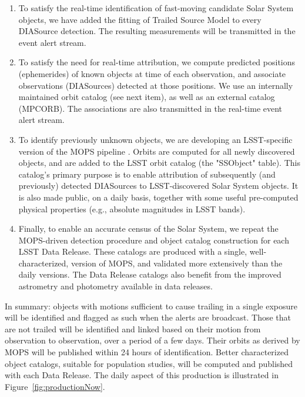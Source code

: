 \documentclass[DM,authoryear,toc]{lsstdoc}
\begin{document}
\begin{enumerate}
	\item To satisfy the real-time identification of fast-moving candidate Solar System objects, we have added the fitting of Trailed Source Model to every DIASource detection. The resulting measurements will be transmitted in the event alert stream.
	\item To satisfy the need for real-time attribution, we compute predicted positions (ephemerides) of known objects at time of each observation, and associate observations (DIASources) detected at those positions. We use an internally maintained orbit catalog (see next item), as well as an external catalog (MPCORB). The associations are also transmitted in the real-time event alert stream.
	\item To identify previously unknown objects, we are developing an LSST-specific version of the MOPS pipeline . Orbits are computed for all newly discovered objects, and are added to the LSST orbit catalog (the "SSObject" table). This catalog's primary purpose is to enable attribution of subsequently (and previously) detected DIASources to LSST-discovered Solar System objects. It is also made public, on a daily basis, together with some useful pre-computed physical properties (e.g., absolute magnitudes in LSST bands).
	\item Finally, to enable an accurate census of the Solar System, we repeat the MOPS-driven detection procedure and object catalog construction for each LSST Data Release. These catalogs are produced with a single, well-characterized, version of MOPS, and validated more extensively than the daily versions. The Data Release catalogs also benefit from the improved astrometry and photometry available in data releases.
\end{enumerate}

In summary: objects with motions sufficient to cause trailing in a single exposure will
be identified and flagged as such when the alerts are broadcast. Those that are not trailed will be identified and linked based on their motion from observation to observation, over a period of a few days. Their orbits as derived by MOPS will be published within 24 hours of identification. Better characterized object catalogs, suitable for population studies, will be computed and published with each Data Release. The daily aspect of this production is illustrated in Figure~\ref{fig:productionNow}.
\end{document}
